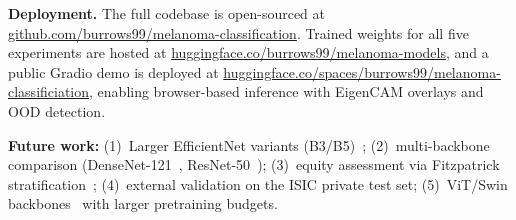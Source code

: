 \documentclass[conference]{IEEEtran}
\begin{document}
\smallskip\noindent\textbf{Deployment.}
The full codebase is open-sourced at
\href{https://github.com/burrows99/melanoma-classification}{github.com/burrows99/melanoma-classification}.
Trained weights for all five experiments are hosted at
\href{https://huggingface.co/burrows99/melanoma-models}{huggingface.co/burrows99/melanoma-models},
and a public Gradio demo is deployed at
\href{https://huggingface.co/spaces/burrows99/melanoma-classificiation}{huggingface.co/spaces/burrows99/melanoma-classificiation},
enabling browser-based inference with EigenCAM overlays and OOD detection.

\smallskip\noindent\textbf{Future work:}
(1)~Larger EfficientNet variants (B3/B5)~\cite{b7};
(2)~multi-backbone comparison (DenseNet-121~\cite{b9}, ResNet-50~\cite{b10});
(3)~equity assessment via Fitzpatrick stratification~\cite{b13};
(4)~external validation on the ISIC private test set;
(5)~ViT/Swin backbones~\cite{b17,b18} with larger pretraining budgets.
\end{document}
